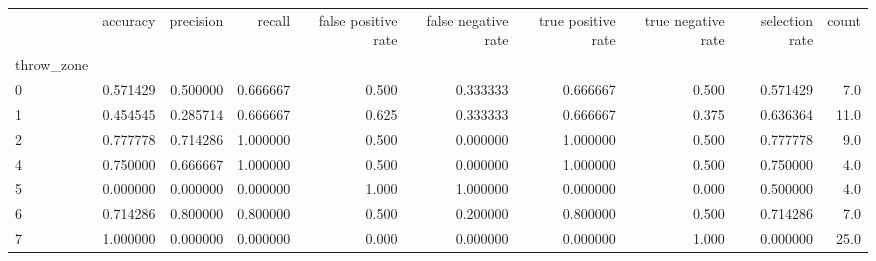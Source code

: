 \begin{tabular}{lrrrrrrrrr}
\toprule
{} &  accuracy &  precision &    recall &  false positive rate &  false negative rate &  true positive rate &  true negative rate &  selection rate &  count \\
throw\_zone &           &            &           &                      &                      &                     &                     &                 &        \\
\midrule
0          &  0.571429 &   0.500000 &  0.666667 &                0.500 &             0.333333 &            0.666667 &               0.500 &        0.571429 &    7.0 \\
1          &  0.454545 &   0.285714 &  0.666667 &                0.625 &             0.333333 &            0.666667 &               0.375 &        0.636364 &   11.0 \\
2          &  0.777778 &   0.714286 &  1.000000 &                0.500 &             0.000000 &            1.000000 &               0.500 &        0.777778 &    9.0 \\
4          &  0.750000 &   0.666667 &  1.000000 &                0.500 &             0.000000 &            1.000000 &               0.500 &        0.750000 &    4.0 \\
5          &  0.000000 &   0.000000 &  0.000000 &                1.000 &             1.000000 &            0.000000 &               0.000 &        0.500000 &    4.0 \\
6          &  0.714286 &   0.800000 &  0.800000 &                0.500 &             0.200000 &            0.800000 &               0.500 &        0.714286 &    7.0 \\
7          &  1.000000 &   0.000000 &  0.000000 &                0.000 &             0.000000 &            0.000000 &               1.000 &        0.000000 &   25.0 \\
\bottomrule
\end{tabular}
